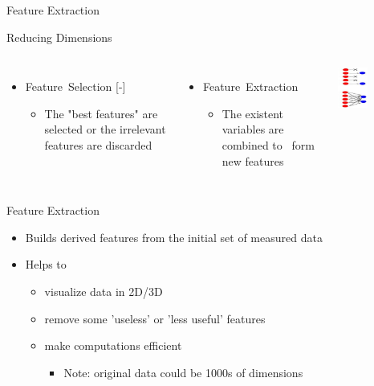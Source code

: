\documentclass[aspectratio=169,14pt,usenames,dvipsnames]{beamer}
\begin{document}
\begin{frame}{}
\centering
\color{orange}
\large Feature Extraction
\end{frame}

\begin{frame}{Reducing Dimensions}
\begin{columns}
\begin{itemize}
\color{Red}
\item Feature Selection
[-]
\begin{itemize}
\item The "best features" are selected or the irrelevant features are discarded
\end{itemize}
\end{itemize}
\begin{itemize}
\color{Red}
\item Feature Extraction
\begin{itemize}
\item The existent variables are combined to  form new features
\end{itemize}
\end{itemize}
\includegraphics[width=0.4\textwidth, height=0.7\textheight]{Images/AIML_FD_IMG2.jpg}
\end{columns}
\end{frame}

\begin{frame}{Feature Extraction}
\begin{itemize}
\item Builds derived features from the initial set of measured data \break
\item Helps to
\begin{itemize}
\item visualize data in 2D/3D
\item remove some 'useless' or 'less useful' features
\item make computations efficient
\begin{itemize}
\item Note: original data could be 1000s of dimensions
\end{itemize}
\end{itemize}
\end{itemize}
\end{frame}
\end{document}

